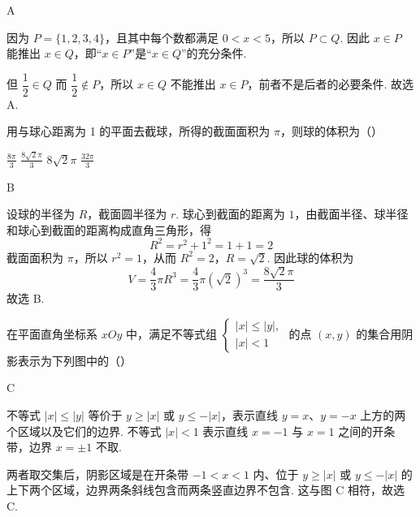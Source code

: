 \begin{answer}
A
\end{answer}

\begin{solution}
因为 \(P=\{1,2,3,4\}\)，且其中每个数都满足 \(0<x<5\)，所以 \(P\subset Q\). 因此
\(x\in P\) 能推出 \(x\in Q\)，即“\(x\in P\)”是“\(x\in Q\)”的充分条件.

但 \(\dfrac{1}{2}\in Q\) 而 \(\dfrac{1}{2}\notin P\)，所以 \(x\in Q\) 不能推出 \(x\in P\)，前者不是后者的必要条件. 故选 A.
\end{solution}

\begin{problem}
用与球心距离为 1 的平面去截球，所得的截面面积为 \(\pi\)，则球的体积为（\quad）

\choices
    {\(\frac{8\pi}{3}\)}
    {\(\frac{8\sqrt{2}\pi}{3}\)}
    {\(8\sqrt{2}\pi\)}
    {\(\frac{32\pi}{3}\)}
\end{problem}

\begin{answer}
B
\end{answer}

\begin{solution}
设球的半径为 \(R\)，截面圆半径为 \(r\). 球心到截面的距离为 \(1\)，由截面半径、球半径和球心到截面的距离构成直角三角形，得
\[
R^2=r^2+1^2=1+1=2
\]
截面面积为 \(\pi\)，所以 \(r^2=1\)，从而 \(R^2=2\)，\(R=\sqrt{2}\). 因此球的体积为
\[
V=\frac{4}{3}\pi R^3=\frac{4}{3}\pi(\sqrt{2})^3=\frac{8\sqrt{2}\pi}{3}
\]
故选 B.
\end{solution}

\begin{problem}
在平面直角坐标系 \(xOy\) 中，满足不等式组 \(\begin{cases}
|x| \leqslant |y|,\\
|x| < 1
\end{cases}\) 的点 \((x, y)\) 的集合用阴影表示为下列图中的（\quad）

    {}
    {}
    {}
\end{problem}

\begin{answer}
C
\end{answer}

\begin{solution}
不等式 \(|x|\leqslant|y|\) 等价于 \(y\geqslant|x|\) 或 \(y\leqslant-|x|\)，表示直线 \(y=x\)、\(y=-x\) 上方的两个区域以及它们的边界. 不等式 \(|x|<1\) 表示直线 \(x=-1\) 与 \(x=1\) 之间的开条带，边界 \(x=\pm1\) 不取.

两者取交集后，阴影区域是在开条带 \(-1<x<1\) 内、位于 \(y\geqslant|x|\) 或 \(y\leqslant-|x|\) 的上下两个区域，边界两条斜线包含而两条竖直边界不包含. 这与图 C 相符，故选 C.
\end{solution}

